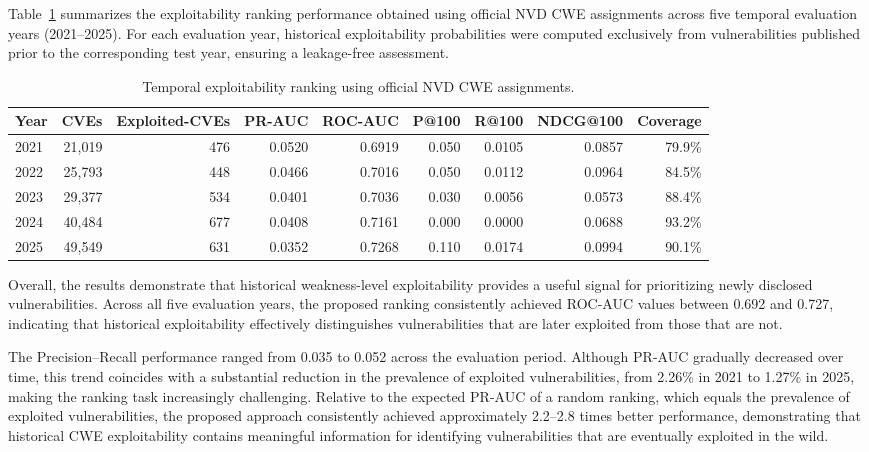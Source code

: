 \documentclass[conference,compsoc]{IEEEtran}
\begin{document}
Table~\ref{tab:cwe_ranking} summarizes the exploitability ranking performance obtained using official NVD CWE assignments across five temporal evaluation years (2021--2025). For each evaluation year, historical exploitability probabilities were computed exclusively from vulnerabilities published prior to the corresponding test year, ensuring a leakage-free assessment.

\begin{table}[ht]
\centering
\caption{Temporal exploitability ranking using official NVD CWE assignments.}
\label{tab:cwe_ranking}
\scriptsize
\begin{tabular}{lrrrrrrrr}
\toprule
\textbf{Year} &
\textbf{CVEs} &
\textbf{  Exploited-CVEs} &
\textbf{ PR-AUC} &
\textbf{ ROC-AUC} &
\textbf{ P@100} &
\textbf{ R@100} &
\textbf{ NDCG@100} &
\textbf{ Coverage} \\
\midrule
2021 & 21,019 & 476 & 0.0520 & 0.6919 & 0.050 & 0.0105 & 0.0857 & 79.9\% \\
2022 & 25,793 & 448 & 0.0466 & 0.7016 & 0.050 & 0.0112 & 0.0964 & 84.5\% \\
2023 & 29,377 & 534 & 0.0401 & 0.7036 & 0.030 & 0.0056 & 0.0573 & 88.4\% \\
2024 & 40,484 & 677 & 0.0408 & 0.7161 & 0.000 & 0.0000 & 0.0688 & 93.2\% \\
2025 & 49,549 & 631 & 0.0352 & 0.7268 & 0.110 & 0.0174 & 0.0994 & 90.1\% \\
\bottomrule
\end{tabular}
\end{table}

Overall, the results demonstrate that historical weakness-level exploitability provides a useful signal for prioritizing newly disclosed vulnerabilities. Across all five evaluation years, the proposed ranking consistently achieved ROC-AUC values between 0.692 and 0.727, indicating that historical exploitability effectively distinguishes vulnerabilities that are later exploited from those that are not.

The Precision--Recall performance ranged from 0.035 to 0.052 across the evaluation period. Although PR-AUC gradually decreased over time, this trend coincides with a substantial reduction in the prevalence of exploited vulnerabilities, from 2.26\% in 2021 to 1.27\% in 2025, making the ranking task increasingly challenging. Relative to the expected PR-AUC of a random ranking, which equals the prevalence of exploited vulnerabilities, the proposed approach consistently achieved approximately 2.2--2.8 times better performance, demonstrating that historical CWE exploitability contains meaningful information for identifying vulnerabilities that are eventually exploited in the wild.
\end{document}
